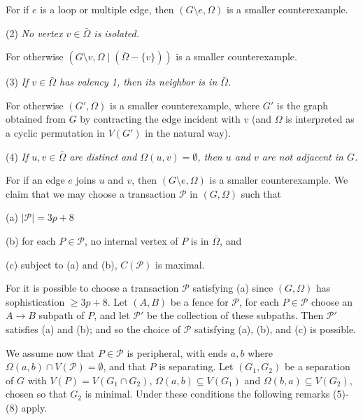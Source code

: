 For if $e$ is a loop or multiple edge, then $(G \setminus e, \Omega)$ is a smaller counterexample.

\hspace*{12pt}(2) \textit{No vertex $v \in \bar{\Omega}$ is isolated.}

For otherwise $(G \setminus v, \Omega \mid (\bar{\Omega} - \{v\}))$ is a smaller counterexample.

\hspace*{12pt}(3) \textit{If $v \in \bar{\Omega}$ has valency 1, then its neighbor is in $\bar{\Omega}$.}

For otherwise $(G', \Omega)$ is a smaller counterexample, where $G'$ is the graph obtained from $G$ by contracting the edge incident with $v$ (and $\Omega$ is interpreted as a cyclic permutation in $V(G')$ in the natural way).

\hspace*{12pt}(4) \textit{If $u, v \in \bar{\Omega}$ are distinct and $\Omega(u, v) = \emptyset$, then $u$ and $v$ are not adjacent in $G$.}

For if an edge $e$ joins $u$ and $v$, then $(G \setminus e, \Omega)$ is a smaller counterexample. We claim that we may choose a transaction $\mathcal{P}$ in $(G, \Omega)$ such that

\hspace*{12pt}(a) $|\mathcal{P}| = 3p + 8$

\hspace*{12pt}(b) for each $P \in \mathcal{P}$, no internal vertex of $P$ is in $\bar{\Omega}$, and

\hspace*{12pt}(c) subject to (a) and (b), $C(\mathcal{P})$ is maximal.

For it is possible to choose a transaction $\mathcal{P}$ satisfying (a) since $(G, \Omega)$ has sophistication $\ge 3p + 8$. Let $(A, B)$ be a fence for $\mathcal{P}$, for each $P \in \mathcal{P}$ choose an $A \to B$ subpath of $P$, and let $\mathcal{P}'$ be the collection of these subpaths. Then $\mathcal{P}'$ satisfies (a) and (b); and so the choice of $\mathcal{P}$ satisfying (a), (b), and (c) is possible.

We assume now that $P \in \mathcal{P}$ is peripheral, with ends $a, b$ where $\Omega(a, b) \cap V(\mathcal{P}) = \emptyset$, and that $P$ is separating. Let $(G_1, G_2)$ be a separation of $G$ with $V(P) = V(G_1 \cap G_2)$, $\Omega(a, b) \subseteq V(G_1)$ and $\Omega(b, a) \subseteq V(G_2)$, chosen so that $G_2$ is minimal. Under these conditions the following remarks (5)-(8) apply.

